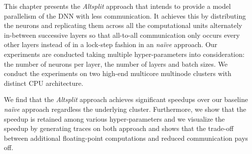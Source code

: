 This chapter presents the \emph{Altsplit} approach that intends to provide a
model parallelism of the DNN with less communication. It achieves this by
distributing the neurons and replicating them across all the computational
units alternately in-between successive layers so that all-to-all
communication only occurs every other layers instead of in a lock-step
fashion in an \emph{na\"{i}ve} approach. Our experiments are conducted taking
multiple hyper-parameters into consideration: the number of neurons per
layer, the number of layers and batch sizes. We conduct the experiments on
two high-end multicore multinode clusters with distinct CPU architecture.

We find that the \emph{Altsplit} approach achieves significant speedups over
our baseline \emph{na\"{i}ve} approach regardless the underlying cluster.
Furthermore, we show that the speedup is retained among various
hyper-parameters and we visualize the speedup by generating traces on both
approach and shows that the trade-off between additional floating-point 
computations and reduced communication pays off.